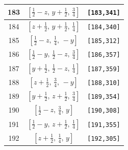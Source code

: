 \documentclass[fleqn,8pt]{jsarticle}
\begin{document}
\begin{longtable}{ccc}
183 & $\left[ \frac{1}{2} - z,\, y + \frac{1}{2},\, \frac{3}{4} \right]$ & {\tt [183,341]} \\ \hline
184 & $\left[ z + \frac{1}{2},\, y + \frac{1}{2},\, \frac{1}{4} \right]$ & {\tt [184,340]} \\ \hline
185 & $\left[ \frac{1}{2} - z,\, \frac{1}{4},\, - y \right]$ & {\tt [185,312]} \\ \hline
186 & $\left[ \frac{1}{2} - y,\, \frac{1}{2} - z,\, \frac{3}{4} \right]$ & {\tt [186,357]} \\ \hline
187 & $\left[ y + \frac{1}{2},\, \frac{1}{2} - z,\, \frac{1}{4} \right]$ & {\tt [187,359]} \\ \hline
188 & $\left[ z + \frac{1}{2},\, \frac{3}{4},\, - y \right]$ & {\tt [188,310]} \\ \hline
189 & $\left[ y + \frac{1}{2},\, z + \frac{1}{2},\, \frac{3}{4} \right]$ & {\tt [189,354]} \\ \hline
190 & $\left[ \frac{1}{2} - z,\, \frac{3}{4},\, y \right]$ & {\tt [190,308]} \\ \hline
191 & $\left[ \frac{1}{2} - y,\, z + \frac{1}{2},\, \frac{1}{4} \right]$ & {\tt [191,355]} \\ \hline
192 & $\left[ z + \frac{1}{2},\, \frac{1}{4},\, y \right]$ & {\tt [192,305]} \\
\end{longtable}
\renewcommand{\arraystretch}{1.2}
\end{document}
